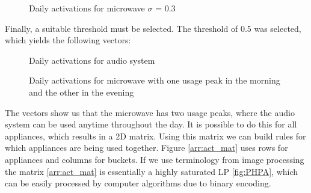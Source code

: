 \begin{figure}[H]
    \centering
    \caption{Daily activations for microwave $\sigma$ = 0.3}
    \label{arr:microwave_acts_norm}
\end{figure}

Finally, a suitable threshold must be selected.
The threshold of 0.5 was selected, which yields the following vectors:

\begin{figure}[H]
    \centering
    \caption{Daily activations for audio system}
    \label{arr:as_acts_vec}
\end{figure}

\begin{figure}[H]
    \centering
    \caption{Daily activations for microwave with one usage peak in the morning and the other in the evening}
    \label{arr:microwave_acts_vec}
\end{figure}

The vectors show us that the microwave has two usage peaks, where the audio system can be used anytime throughout the day.
It is possible to do this for all appliances, which results in a 2D matrix. 
Using this matrix we can build rules for which appliances are being used together.
Figure \ref{arr:act_mat} uses rows for appliances and columns for buckets.  
If we use terminology from image processing the matrix \ref{arr:act_mat} is essentially a highly saturated LP \ref{fig:PHPA},
which can be easily processed by computer algorithms due to binary encoding. 

